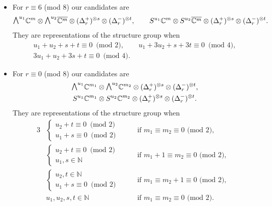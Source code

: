 \documentclass[10pt,a4paper]{amsart}
\newcommand{\ext}{\raise1pt\hbox{$\textstyle\bigwedge$}}
\newcommand{\sym}{S}
\numberwithin{equation}{section}
\begin{document}
\begin{itemize}
 \item For $r\equiv 6$ (mod 8) our candidates are
 \begin{gather*}\ext^{u_1} \mathbb{C}^{m}\otimes \ext^{u_2} \overline{\mathbb{C}^{m}}\otimes (\Delta_r^+)^{\otimes s}\otimes (\Delta_r^-)^{\otimes t},
 \qquad \sym^{u_1}\mathbb{C}^{m}\otimes \sym^{u_2}\overline{\mathbb{C}^{m}}\otimes (\Delta_r^+)^{\otimes s}\otimes (\Delta_r^-)^{\otimes t}.\end{gather*}
 They are representations of the structure group when
 \begin{gather*}
u_1+u_2+s+t \equiv 0 \,\,\,\mbox{(mod 2)},\qquad u_1+3u_2+s+3t \equiv 0 \,\,\,\mbox{(mod 4)},\\
3u_1+u_2+3s+t \equiv 0 \,\,\,\mbox{(mod 4)}.
 \end{gather*}

 \item For $r\equiv 0$ (mod 8) our candidates are
 \begin{gather*}\ext^{u_1} \mathbb{C}^{m_1}\otimes \ext^{u_2} \mathbb{C}^{m_2}\otimes (\Delta_r^+)^{\otimes s}\otimes (\Delta_r^-)^{\otimes t},\\
 \sym^{u_1}\mathbb{C}^{m_1}\otimes \sym^{u_2}\mathbb{C}^{m_2}\otimes (\Delta_r^+)^{\otimes s}\otimes (\Delta_r^-)^{\otimes t}.\end{gather*}
 They are representations of the structure group when
 \begin{alignat*}{3}
 & \begin{cases}
u_2+t\equiv 0 \,\,\,\mbox{(mod 2)} \\
u_1+s\equiv 0 \,\,\,\mbox{(mod 2)}
 \end{cases}
 \quad && \mbox{if $m_1\equiv m_2\equiv 0$ (mod 2)},& \\
& \begin{cases}
u_2+t\equiv 0 \,\,\,\mbox{(mod 2)} \\
u_1,s\in\mathbb{N}
 \end{cases}
 \quad & & \mbox{if $m_1+1\equiv m_2\equiv 0$ (mod 2)},& \\
& \begin{cases}
u_2,t\in\mathbb{N} \\
u_1+s\equiv 0 \,\,\,\mbox{(mod 2)}
 \end{cases}
 \quad && \mbox{if $m_1\equiv m_2+1\equiv 0$ (mod 2)},& \\
& u_1,u_2,s,t\in\mathbb{N}\quad && \mbox{if $m_1\equiv m_2\equiv 0$ (mod 2)}. &
 \end{alignat*}
\end{itemize}
\end{document}
